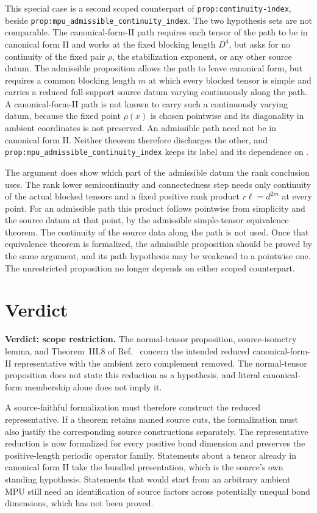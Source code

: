 \documentclass{article}
\begin{document}
This special case is a second scoped counterpart of
\texttt{prop:continuity-index}, beside
\texttt{prop:mpu\_admissible\_continuity\_index}. The two hypothesis sets are
not comparable. The canonical-form-II path requires each tensor of the path to
be in canonical form II and works at the fixed blocking length $D^4$, but asks for no
continuity of the fixed pair $\rho$, the stabilization exponent, or any other
source datum. The admissible proposition allows the path to leave canonical
form, but requires a common blocking length $m$ at which every blocked tensor
is simple and carries a reduced full-support source datum varying continuously
along the path. A canonical-form-II path is not known to carry such a
continuously varying datum, because the fixed point $\rho(x)$ is chosen
pointwise and its diagonality in ambient coordinates is not preserved. An
admissible path need not be in canonical form II. Neither theorem therefore
discharges the other, and \texttt{prop:mpu\_admissible\_continuity\_index}
keeps its label and its dependence on .

The argument does show which part of the admissible datum the rank conclusion
uses. The rank lower semicontinuity and connectedness step needs only
continuity of the actual blocked tensors and a fixed positive rank product
$r\ell=d^{2m}$ at every point. For an admissible path this product follows
pointwise from simplicity and the source datum at that point, by the admissible
simple-tensor equivalence theorem. The continuity of the source data along the
path is not used. Once that equivalence theorem is formalized, the admissible
proposition should be proved by the same argument, and its path hypothesis may
be weakened to a pointwise one. The unrestricted proposition no longer depends
on either scoped counterpart.

\section{Verdict}

\textbf{Verdict: scope restriction.} The normal-tensor proposition,
source-isometry lemma, and Theorem~III.8 of Ref.~\cite{Cirac2017MPU} concern
the intended reduced canonical-form-II representative with the ambient zero
complement removed. The normal-tensor proposition does not state this reduction
as a hypothesis, and literal canonical-form membership alone does not imply it.

A source-faithful formalization must therefore construct the reduced
representative. If a theorem retains named source cuts, the formalization must
also justify the corresponding source constructions separately. The
representative reduction is now formalized for every positive bond dimension
and preserves the positive-length periodic operator family. Statements about a
tensor already in canonical form II take the bundled presentation, which is the
source's own standing hypothesis. Statements that would start from an arbitrary
ambient MPU still need an identification of source factors across potentially
unequal bond dimensions, which has not been proved.
\end{document}
